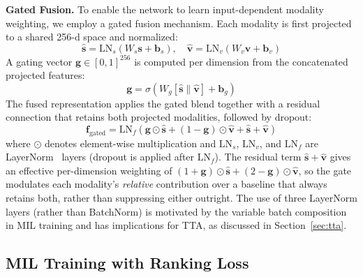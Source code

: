 \documentclass[sigconf]{acmart}
\begin{document}
\textbf{Gated Fusion.} To enable the network to learn input-dependent modality weighting, we employ a gated fusion mechanism. Each modality is first projected to a shared 256-d space and normalized:
\begin{equation}
    \hat{\mathbf{s}} = \text{LN}_s(W_s \mathbf{s} + \mathbf{b}_s), \quad \hat{\mathbf{v}} = \text{LN}_v(W_v \mathbf{v} + \mathbf{b}_v)
\end{equation}
A gating vector $\mathbf{g} \in [0, 1]^{256}$ is computed per dimension from the concatenated projected features:
\begin{equation}
    \mathbf{g} = \sigma\left( W_g \left[ \hat{\mathbf{s}} \| \hat{\mathbf{v}} \right] + \mathbf{b}_g \right)
\end{equation}
The fused representation applies the gated blend together with a residual connection that retains both projected modalities, followed by dropout:
\begin{equation}
    \mathbf{f}_{\text{gated}} = \text{LN}_f\left( \mathbf{g} \odot \hat{\mathbf{s}} + (1 - \mathbf{g}) \odot \hat{\mathbf{v}} + \hat{\mathbf{s}} + \hat{\mathbf{v}} \right)
\end{equation}
where $\odot$ denotes element-wise multiplication and $\text{LN}_s$, $\text{LN}_v$, and $\text{LN}_f$ are LayerNorm~\cite{ba2016layernorm} layers (dropout is applied after $\text{LN}_f$). The residual term $\hat{\mathbf{s}} + \hat{\mathbf{v}}$ gives an effective per-dimension weighting of $(1 + \mathbf{g}) \odot \hat{\mathbf{s}} + (2 - \mathbf{g}) \odot \hat{\mathbf{v}}$, so the gate modulates each modality's \emph{relative} contribution over a baseline that always retains both, rather than suppressing either outright. The use of three LayerNorm layers (rather than BatchNorm) is motivated by the variable batch composition in MIL training and has implications for TTA, as discussed in Section~\ref{sec:tta}.

\subsection{MIL Training with Ranking Loss}
\end{document}

